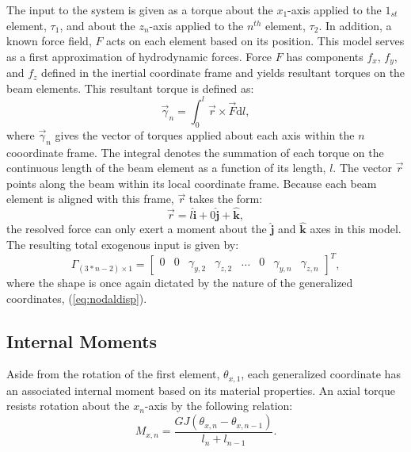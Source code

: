 \documentclass[letterpaper,10pt,conference]{ieeeconf}   %
\begin{document}
The input to the system is given as a torque about the $x_1$-axis applied to the $1_{st}$ element, $\tau_1$, and about the $z_n$-axis applied to the $n^{th}$ element, $\tau_2$. In addition, a known force field, $F$ acts on each element based on its position. This model serves as a first approximation of hydrodynamic forces. Force $F$ has components $f_x$, $f_y$, and $f_z$ defined in the inertial coordinate frame and yields resultant torques on the beam elements. This resultant torque is defined as:
%
\begin{equation}
\label{eq:forced_torque}
\vec{\gamma}_{n} = \int_{0}^{l}\vec{r} \times \vec{F} \mathrm{d}l,
\end{equation}
%
where $\vec{\gamma}_n$ gives the vector of torques applied about each axis within the $n$ cooordinate frame. The integral denotes the summation of each torque on the continuous length of the beam element as a function of its length, $l$. The vector $\vec{r}$ points along the beam within its local coordinate frame. Because each beam element is aligned with this frame, $\vec{r}$ takes the form:
%
\begin{equation}
\label{eq:r_vector}
\vec{r} = l \mathbf{\hat{i}} + 0 \mathbf{\hat{j}} + \mathbf{\hat{k}},
\end{equation}
%
the resolved force can only exert a moment about the $\mathbf{\hat{j}}$ and $\mathbf{\hat{k}}$ axes in this model. The resulting total exogenous input is given by:
%
\begin{equation}
\label{eq:Gamma}
\Gamma_{(3*n - 2) \times 1} = 
\begin{bmatrix}
 0 & 
 0 &
 \gamma_{y,2} & 
 \gamma_{z,2} &  
 \dots & 
 0 & 
 \gamma_{y,n} & 
 \gamma_{z,n}
\end{bmatrix}^T,
\end{equation}
%
where the shape is once again dictated by the nature of the generalized coordinates, (\ref{eq:nodaldisp}).

\subsection{Internal Moments}
\label{sec:internal_forces}

Aside from the rotation of the first element, $\theta_{x,1}$, each generalized coordinate has an associated internal moment based on its material properties. An axial torque resists rotation about the $x_n$-axis by the following relation:
%
\begin{equation}
\label{eq:m_x}
M_{x,n} = \frac{GJ (\theta_{x,n} - \theta_{x,n-1})}{l_n + l_{n-1}}.
\end{equation}
%
\end{document}
